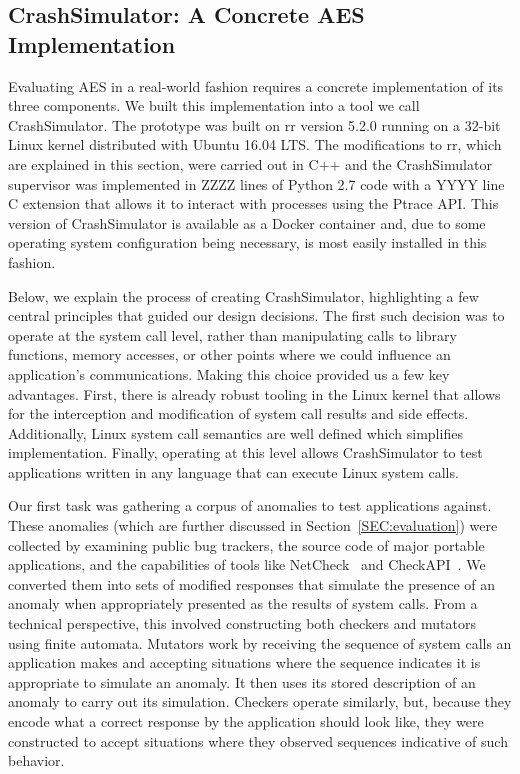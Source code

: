 \subsection{CrashSimulator: A Concrete AES Implementation}
\label{SUBSEC:ApproachCrashSim}
Evaluating AES in a real-world fashion requires a
concrete implementation of its three components.
We built this implementation into a tool we call CrashSimulator.  The
prototype was built on rr version 5.2.0 running on a 32-bit Linux kernel
distributed with Ubuntu 16.04 LTS.  The modifications to rr, which are
explained in this section, were carried out in C++ and the CrashSimulator
supervisor was implemented in ZZZZ lines of Python 2.7 code with a YYYY
line C extension that allows it to interact with processes using the Ptrace
API.
This version of CrashSimulator is available as a Docker container and,
due to some operating system configuration being necessary, is most easily
installed in this fashion.

Below, we explain the process of creating CrashSimulator, highlighting a
few central principles that guided our design decisions. The first such
decision was to operate at the system call level, rather than manipulating
calls to library functions, memory accesses, or other points where we could
influence an application's communications. Making this choice provided us a
few key advantages. First, there is already robust tooling in the Linux
kernel that allows for the interception and modification of system call
results and side effects. Additionally, Linux system call semantics are
well defined which simplifies implementation. Finally, operating at this
level allows CrashSimulator to test applications written in any language
that can execute Linux system calls.

Our first task was
gathering a corpus of anomalies to test applications
against.  These anomalies (which are further discussed
in Section~\ref{SEC:evaluation})
were collected by examining public bug trackers,
the source code of major portable applications, and the capabilities of
tools like NetCheck~\cite{Zhuang_NSDI_2014}
and CheckAPI~\cite{rasley2015detecting}.
We converted them
into sets of modified responses
that simulate the presence of an anomaly when
appropriately presented as the results of system calls.
From a technical perspective,
this involved constructing
both checkers and mutators using finite automata.
Mutators work by receiving the sequence of system calls
an application makes and accepting situations where the sequence indicates
it is appropriate to simulate an anomaly.
It then uses its stored
description of an anomaly
to carry out its simulation.
Checkers operate similarly,
but, because they encode what a
correct response by the application should look like,
they were constructed
to accept situations where they observed sequences indicative of such
behavior.


